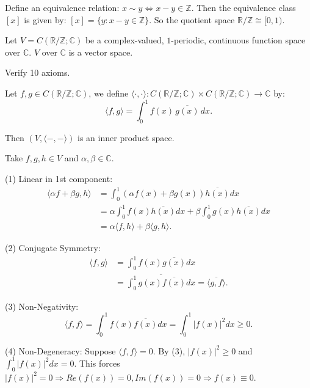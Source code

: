\documentclass[12pt]{article}
\begin{document}
\begin{definition}
    Define an equivalence relation:
    $x\sim y \Leftrightarrow x-y\in\mathbb{Z}$.
    Then the equivalence class $[x]$ is given by:
    $[x]=\{y:x-y\in\mathbb{Z}\}$.
    So the quotient space $\mathbb{R}/\mathbb{Z} \cong [0,1)$.
\end{definition}

\begin{theorem}
    Let $V=C(\mathbb{R}/\mathbb{Z};\mathbb{C})$ be a complex-valued, $1$-periodic, continuous function space over $\mathbb{C}$. 
    $V$ over $\mathbb{C}$ is a vector space. 
\end{theorem}

\begin{pfbox}
Verify 10 axioms.
\end{pfbox}

\begin{theorem}
Let $f,g\in C(\mathbb{R}/\mathbb{Z}; \mathbb{C})$, 
we define $\langle \cdot, \cdot \rangle: C(\mathbb{R}/\mathbb{Z}; \mathbb{C})\times C(\mathbb{R}/\mathbb{Z}; \mathbb{C}) \rightarrow \mathbb{C}$ by:
\[
\langle f, g \rangle = \int_0^1 f(x) \, \overline{g(x)} \, dx.
\]

Then $(V,\langle-,-\rangle)$ is an inner product space.
\end{theorem}

\begin{pfbox}
    Take $f,g,h\in V$ and $\alpha,\beta\in\mathbb{C}$.
    
    (1) Linear in 1st component:
    \begin{align*}
        \langle\alpha f+\beta g,h\rangle &= \int_{0}^{1}(\alpha f(x)+\beta g(x))\overline{h(x)}dx  \\
        &= \alpha\int_{0}^{1}f(x)\overline{h(x)}dx + \beta\int_{0}^{1}g(x)\overline{h(x)}dx  \\
        &= \alpha\langle f,h\rangle+\beta\langle g,h\rangle.
    \end{align*}

    (2) Conjugate Symmetry:
    \begin{align*}
        \langle f,g\rangle &= \int_{0}^{1}f(x)\overline{g(x)}dx \\
        &= \overline{\int_{0}^{1}g(x)\overline{f(x)}dx} = \overline{\langle g,f\rangle}.
    \end{align*}

    (3) Non-Negativity:
    $$ \langle f,f\rangle=\int_{0}^{1}f(x)\overline{f(x)}dx=\int_{0}^{1}|f(x)|^{2}dx\ge0.$$

    (4) Non-Degeneracy:
    Suppose $\langle f,f\rangle=0$. By (3), $|f(x)|^{2}\ge0$ and $\int_{0}^{1}|f(x)|^{2}dx=0$. 
    This forces $|f(x)|^{2}=0 \Rightarrow Re(f(x))=0, Im(f(x))=0 \Rightarrow f(x)\equiv0$.
\end{pfbox}
\end{document}
